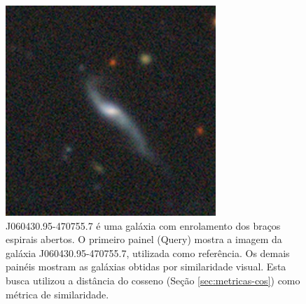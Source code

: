 \begin{figure}[!ht]
  \includegraphics[width=0.195\linewidth]{figures/stamps/q5_29}
  \caption{J060430.95-470755.7 é uma galáxia com enrolamento dos braços espirais abertos. O primeiro painel (Query) mostra a imagem da galáxia J060430.95-470755.7, utilizada como referência. Os demais painéis mostram as galáxias obtidas por similaridade visual. Esta busca utilizou a distância do cosseno (Seção \ref{sec:metricas-cos}) como métrica de similaridade.}
  \label{fig:q5}
\end{figure}




